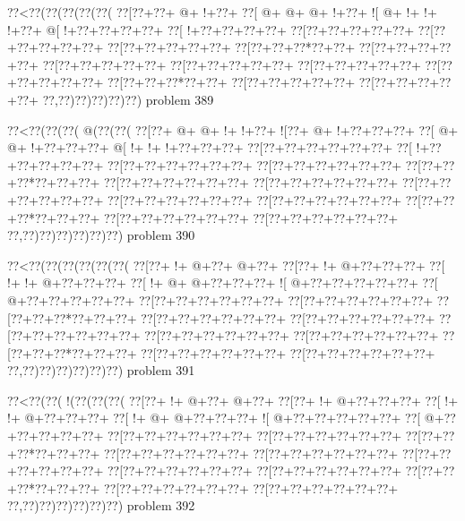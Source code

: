 \vbox{\vbox{\goo
\0??<\0??(\0??(\0??(\0??(\0??(
\0??[\0??+\0??+\- @+\- !+\0??+
\0??[\- @+\- @+\- @+\- !+\0??+
\- ![\- @+\- !+\- !+\- !+\0??+
\- @[\- !+\0??+\0??+\0??+\0??+
\0??[\- !+\0??+\0??+\0??+\0??+
\0??[\0??+\0??+\0??+\0??+\0??+
\0??[\0??+\0??+\0??+\0??+\0??+
\0??[\0??+\0??+\0??+\0??+\0??+
\0??[\0??+\0??+\0??*\0??+\0??+
\0??[\0??+\0??+\0??+\0??+\0??+
\0??[\0??+\0??+\0??+\0??+\0??+
\0??[\0??+\0??+\0??+\0??+\0??+
\0??[\0??+\0??+\0??+\0??+\0??+
\0??[\0??+\0??+\0??+\0??+\0??+
\0??[\0??+\0??+\0??*\0??+\0??+
\0??[\0??+\0??+\0??+\0??+\0??+
\0??[\0??+\0??+\0??+\0??+\0??+
\0??,\0??)\0??)\0??)\0??)\0??)
}
\hfil problem 389\hfil\break
}

\vbox{\vbox{\goo
\0??<\0??(\0??(\0??(\- @(\0??(\0??(
\0??[\0??+\- @+\- @+\- !+\- !+\0??+
\- ![\0??+\- @+\- !+\0??+\0??+\0??+
\0??[\- @+\- @+\- !+\0??+\0??+\0??+
\- @[\- !+\- !+\- !+\0??+\0??+\0??+
\0??[\0??+\0??+\0??+\0??+\0??+\0??+
\0??[\- !+\0??+\0??+\0??+\0??+\0??+
\0??[\0??+\0??+\0??+\0??+\0??+\0??+
\0??[\0??+\0??+\0??+\0??+\0??+\0??+
\0??[\0??+\0??+\0??*\0??+\0??+\0??+
\0??[\0??+\0??+\0??+\0??+\0??+\0??+
\0??[\0??+\0??+\0??+\0??+\0??+\0??+
\0??[\0??+\0??+\0??+\0??+\0??+\0??+
\0??[\0??+\0??+\0??+\0??+\0??+\0??+
\0??[\0??+\0??+\0??+\0??+\0??+\0??+
\0??[\0??+\0??+\0??*\0??+\0??+\0??+
\0??[\0??+\0??+\0??+\0??+\0??+\0??+
\0??[\0??+\0??+\0??+\0??+\0??+\0??+
\0??,\0??)\0??)\0??)\0??)\0??)\0??)
}
\hfil problem 390\hfil\break
}

\vbox{\vbox{\goo
\0??<\0??(\0??(\0??(\0??(\0??(\0??(
\0??[\0??+\- !+\- @+\0??+\- @+\0??+
\0??[\0??+\- !+\- @+\0??+\0??+\0??+
\0??[\- !+\- !+\- @+\0??+\0??+\0??+
\0??[\- !+\- @+\- @+\0??+\0??+\0??+
\- ![\- @+\0??+\0??+\0??+\0??+\0??+
\0??[\- @+\0??+\0??+\0??+\0??+\0??+
\0??[\0??+\0??+\0??+\0??+\0??+\0??+
\0??[\0??+\0??+\0??+\0??+\0??+\0??+
\0??[\0??+\0??+\0??*\0??+\0??+\0??+
\0??[\0??+\0??+\0??+\0??+\0??+\0??+
\0??[\0??+\0??+\0??+\0??+\0??+\0??+
\0??[\0??+\0??+\0??+\0??+\0??+\0??+
\0??[\0??+\0??+\0??+\0??+\0??+\0??+
\0??[\0??+\0??+\0??+\0??+\0??+\0??+
\0??[\0??+\0??+\0??*\0??+\0??+\0??+
\0??[\0??+\0??+\0??+\0??+\0??+\0??+
\0??[\0??+\0??+\0??+\0??+\0??+\0??+
\0??,\0??)\0??)\0??)\0??)\0??)\0??)
}
\hfil problem 391\hfil\break
}

\vbox{\vbox{\goo
\0??<\0??(\0??(\- !(\0??(\0??(\0??(
\0??[\0??+\- !+\- @+\0??+\- @+\0??+
\0??[\0??+\- !+\- @+\0??+\0??+\0??+
\0??[\- !+\- !+\- @+\0??+\0??+\0??+
\0??[\- !+\- @+\- @+\0??+\0??+\0??+
\- ![\- @+\0??+\0??+\0??+\0??+\0??+
\0??[\- @+\0??+\0??+\0??+\0??+\0??+
\0??[\0??+\0??+\0??+\0??+\0??+\0??+
\0??[\0??+\0??+\0??+\0??+\0??+\0??+
\0??[\0??+\0??+\0??*\0??+\0??+\0??+
\0??[\0??+\0??+\0??+\0??+\0??+\0??+
\0??[\0??+\0??+\0??+\0??+\0??+\0??+
\0??[\0??+\0??+\0??+\0??+\0??+\0??+
\0??[\0??+\0??+\0??+\0??+\0??+\0??+
\0??[\0??+\0??+\0??+\0??+\0??+\0??+
\0??[\0??+\0??+\0??*\0??+\0??+\0??+
\0??[\0??+\0??+\0??+\0??+\0??+\0??+
\0??[\0??+\0??+\0??+\0??+\0??+\0??+
\0??,\0??)\0??)\0??)\0??)\0??)\0??)
}
\hfil problem 392\hfil\break
}

